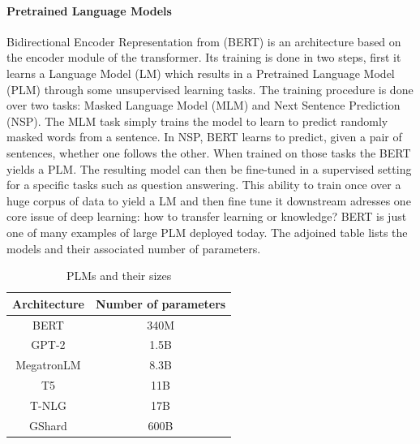 \message{ !name(projectproposal.tex)}\documentclass{article}
\begin{document}
\paragraph{Pretrained Language Models}Bidirectional Encoder Representation from
(BERT)\cite{bert} is an architecture based on the encoder module of the
transformer. Its training is done in two steps, first it learns a Language Model
(LM) which results in a Pretrained Language Model (PLM) through some
unsupervised learning tasks. The training procedure is done over two tasks:
Masked Language Model (MLM) and Next Sentence Prediction (NSP). The MLM task
simply trains the model to learn to predict randomly masked words from a
sentence. In NSP, BERT learns to predict, given a pair of sentences, whether one
follows the other. When trained on those tasks the BERT yields a PLM. The
resulting model can then be fine-tuned in a supervised setting for a specific
tasks such as question answering. This ability to train once over a huge corpus
of data to yield a LM and then fine tune it downstream adresses one core issue
of deep learning: how to transfer learning or knowledge?
BERT is just one of many examples of large PLM deployed today. The
adjoined table lists the models and their associated number of parameters.
\begin{table}[htbp]
\centering
  \begin{tabular}{cc}
    \toprule
    Architecture & Number of parameters\\
    \midrule
    BERT & 340M\\
    GPT-2 & 1.5B\\
    MegatronLM & 8.3B\\
    T5 & 11B\\
    T-NLG & 17B\\
    GShard & 600B\\
    \bottomrule
  \end{tabular}
  \caption{PLMs and their sizes\cite{gupta2020compression}}
\end{table}

\clearpage
\end{document}

